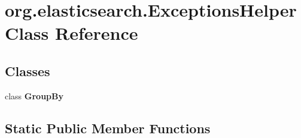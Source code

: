 \hypertarget{classorg_1_1elasticsearch_1_1_exceptions_helper}{}\section{org.\+elasticsearch.\+Exceptions\+Helper Class Reference}
\label{classorg_1_1elasticsearch_1_1_exceptions_helper}
\subsection*{Classes}
\begin{DoxyCompactItemize}
\item 
class {\bfseries Group\+By}
\end{DoxyCompactItemize}
\subsection*{Static Public Member Functions}
